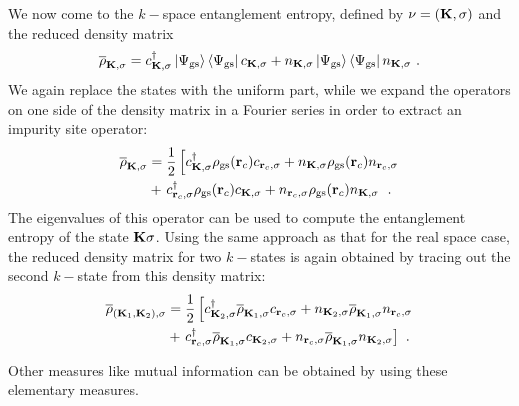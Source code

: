 \documentclass[reprint,hidelinks]{revtex4-2}
\begin{document}
We now come to the \(k-\)space entanglement entropy, defined by \(\nu = ({\bf K},\sigma)\) and the reduced density matrix
\begin{equation}\begin{aligned}
	\overline\rho_{{\bf K},\sigma} = c^\dagger_{{\bf K},\sigma} \ket{\Psi_\text{gs}}\bra{\Psi_\text{gs}} c_{{\bf K},\sigma} + n_{{\bf K},\sigma} \ket{\Psi_\text{gs}}\bra{\Psi_\text{gs}} n_{{\bf K},\sigma}~.
\end{aligned}\end{equation}
We again replace the states with the uniform part, while we expand the operators on one side of the density matrix in a Fourier series in order to extract an impurity site operator:
\begin{equation}\begin{aligned}
	\overline\rho_{{\bf K},\sigma} &= \frac{1}{2}\left[c^\dagger_{{\bf K},\sigma} \rho_\text{gs}({\bf r}_c) c_{{\bf r}_c,\sigma} + n_{{\bf K},\sigma} \rho_\text{gs}({\bf r}_c) n_{{\bf r}_c,\sigma} \right.\\
	&+ \left. c^\dagger_{{\bf r}_c,\sigma} \rho_\text{gs}({\bf r}_c) c_{{\bf K},\sigma} + n_{{\bf r}_c,\sigma} \rho_\text{gs}({\bf r}_c) n_{{\bf K},\sigma}\right. ~.
\end{aligned}\end{equation}
The eigenvalues of this operator can be used to compute the entanglement entropy of the state \({\bf K}\sigma\). Using the same approach as that for the real space case, the reduced density matrix for two \(k-\)states is again obtained by tracing out the second \(k-\)state from this density matrix:
\begin{equation}\begin{aligned}
	\overline\rho_{({\bf K}_1, {\bf K}_2),\sigma} &= \frac{1}{2}\left[c^\dagger_{{\bf K}_2,\sigma} \overline\rho_{{\bf K}_1,\sigma} c_{{\bf r}_c,\sigma} + n_{{\bf K}_2,\sigma} \overline\rho_{{\bf K}_1,\sigma} n_{{\bf r}_c,\sigma} \right.\\
	&+ \left. c^\dagger_{{\bf r}_c,\sigma} \overline\rho_{{\bf K}_1,\sigma} c_{{\bf K}_2,\sigma} + n_{{\bf r}_c,\sigma} \overline\rho_{{\bf K}_1,\sigma} n_{{\bf K}_2,\sigma}\right] ~.
\end{aligned}\end{equation}

Other measures like mutual information can be obtained by using these elementary measures.



\clearpage
\end{document}
